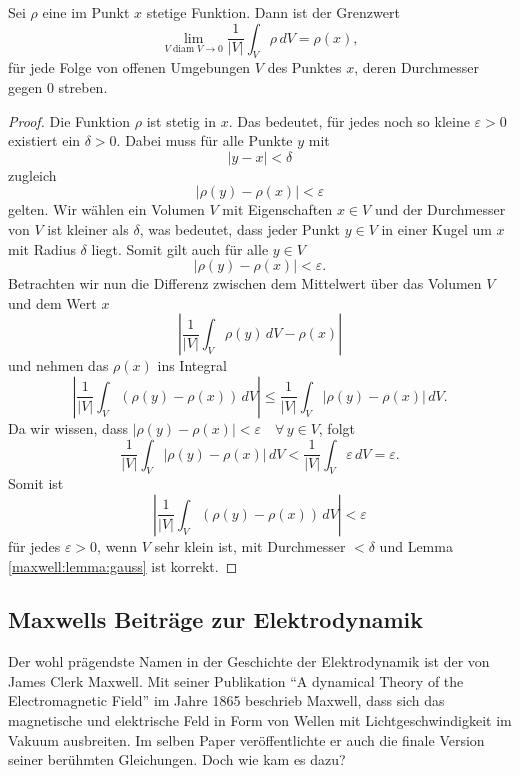 \begin{lemma}
	\label{maxwell:lemma:gauss}
	Sei $\rho$ eine im Punkt $x$ stetige Funktion. Dann ist der Grenzwert
	\[
	\lim_{V\operatorname{diam}V\to 0} \frac{1}{|V|} \int_V \rho\,dV = \rho(x),
	\]
für jede Folge von offenen Umgebungen $V$ des Punktes $x$, deren Durchmesser gegen 0 streben.
\end{lemma}
\begin{proof}
	Die Funktion $\rho$ ist stetig in $x$. Das bedeutet, für jedes noch so kleine $\varepsilon > 0$ existiert ein $\delta > 0$.
	Dabei muss für alle Punkte $y$ mit
	\[
	\left|y-x\right| < \delta	
	\]
	zugleich 
	\[
	\left|\rho(y) - \rho(x)\right| < \varepsilon
	\] 
	gelten.
	Wir wählen ein Volumen $V$ mit Eigenschaften $x \in V$ und der Durchmesser von $V$ ist kleiner als $\delta$, was bedeutet, dass jeder Punkt $y \in V$ in einer Kugel um $x$ mit Radius $\delta$ liegt.
	Somit gilt auch für alle $y \in V$
	\[
	\left|\rho(y) - \rho(x)\right| < \varepsilon .
	\]
	Betrachten wir nun die Differenz zwischen dem Mittelwert über das Volumen $V$ und dem Wert $x$
	\[
	\left|
	\frac{1}{\left|V\right|}
	\int_{V}
	\rho(y)
	\,
	dV
	-
	\rho(x)
	\right|
	\]
	und nehmen das $\rho(x)$ ins Integral
	\[
	\left|
	\frac{1}{\left|V\right|}
	\int_{V}
	(\rho(y) - \rho(x)) \, dV
	\right|
	\leq
	\frac{1}{\left|V\right|}
	\int_{V}
	\left|
	\rho(y) - \rho(x)
	\right|
	\,
	dV .
	\]
	Da wir wissen, dass $\left|\rho(y) - \rho(x)\right| < \varepsilon \quad \forall \, y \in V$, folgt
	\[
	\frac{1}{\left|V\right|}
	\int_{V}
	\left|
	\rho(y) - \rho(x)
	\right|
	\,
	dV
	<
	\frac{1}{\left|V\right|}
	\int_{V}
	\varepsilon
	\,
	dV
	=
	\varepsilon .
	\]
	Somit ist 
	\[
	\left|
	\frac{1}{\left|V\right|}
	\int_{V}
	(\rho(y) - \rho(x)) \, dV
	\right|
	<
	\varepsilon
	\]
	für jedes $\varepsilon > 0$, wenn $V$ sehr klein ist, mit Durchmesser $< \delta$ und Lemma \ref{maxwell:lemma:gauss} ist korrekt.
\end{proof}


\subsection{Maxwells Beiträge zur Elektrodynamik}
Der wohl prägendste Namen in der Geschichte der Elektrodynamik ist der von James Clerk Maxwell.
Mit seiner Publikation ``A dynamical Theory of the Electromagnetic Field'' \cite{maxwell:maxwell:theory} im Jahre 1865 beschrieb Maxwell, dass sich das magnetische und elektrische Feld in Form von Wellen mit Lichtgeschwindigkeit im Vakuum ausbreiten.
Im selben Paper veröffentlichte er auch die finale Version seiner berühmten Gleichungen. Doch wie kam es dazu?

